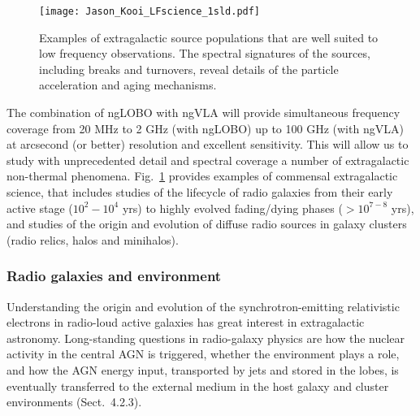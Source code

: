 \documentclass[11pt]{article}
\begin{document}
\begin{figure}[ht!]
\begin{center}
\texttt{[image: Jason\_Kooi\_LFscience\_1sld.pdf]}
\end{center}
\vspace{-0.95cm}
  \caption{Examples of extragalactic source populations that are well suited to low frequency observations. The spectral signatures of the sources, including breaks and turnovers,  reveal details of the particle acceleration and aging mechanisms.
}
\label{ngloboSCIENCE}
\end{figure}

The combination of ngLOBO with ngVLA will provide simultaneous frequency coverage 
from 20 MHz to 2 GHz (with ngLOBO) up to 100 GHz (with ngVLA) at arcsecond (or better) 
resolution and excellent sensitivity. This will allow us to study with unprecedented 
detail and spectral coverage a number of extragalactic non-thermal phenomena. 
Fig.~\ref{ngloboSCIENCE} provides examples of commensal extragalactic science, 
that includes studies of the lifecycle of radio galaxies from their early active 
stage ($10^2-10^4$ yrs) to highly evolved fading/dying phases ($>10^{7-8}$ yrs), and 
studies of the origin and evolution of diffuse radio sources in galaxy clusters 
(radio relics, halos and minihalos).



\subsubsection{Radio galaxies and environment}

Understanding the origin and evolution of the synchrotron-emitting relativistic electrons in 
radio-loud active galaxies has great interest in extragalactic astronomy. Long-standing 
questions in radio-galaxy physics are how the nuclear activity in the central AGN is triggered, 
whether the environment plays a role, and how the AGN energy input, transported by jets and 
stored in the lobes, is eventually transferred to the external medium in the host galaxy and 
cluster environments (Sect.\ 4.2.3). 
\end{document}
